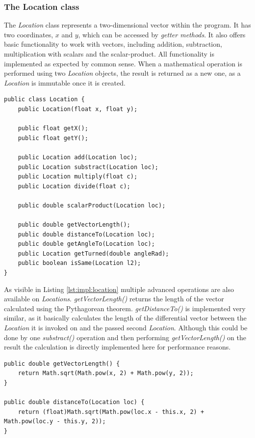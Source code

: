 \subsubsection{The Location class}

The \textit{Location} class represents a two-dimensional vector within the program. It has two coordinates, $x$ and $y$, which can be accessed by \textit{getter methods}. It also offers basic functionality to work with vectors, including addition, subtraction, multiplication with scalars and the scalar-product. All functionality is implemented as expected by common sense. When a mathematical operation is performed using two \textit{Location} objects, the result is returned as a new one, as a \textit{Location} is immutable once it is created.

\begin{lstlisting}[caption={The public interface of the Location class}, label=lst:impl:location]
public class Location {
	public Location(float x, float y);
	
	public float getX();
	public float getY();
	
	public Location add(Location loc);
	public Location substract(Location loc);
	public Location multiply(float c);
	public Location divide(float c);
	
	public double scalarProduct(Location loc);
	
	public double getVectorLength();
	public double distanceTo(Location loc);
	public double getAngleTo(Location loc);
	public Location getTurned(double angleRad);
	public boolean isSame(Location l2);
}
\end{lstlisting}

As visible in Listing \ref{lst:impl:location} multiple advanced operations are also available on \textit{Locations}. \textit{getVectorLength()} returns the length of the vector calculated using the Pythagorean theorem. \textit{getDistanceTo()} is implemented very similar, as it basically calculates the length of the differential vector between the \textit{Location} it is invoked on and the passed second \textit{Location}. Although this could be done by one \textit{substract()} operation and then performing \textit{getVectorLength()} on the result the calculation is directly implemented here for performance reasons.

\begin{lstlisting}[caption={Implementation of getVectorLength() and getDistanceTo()},label=lst:impl:location_length]
public double getVectorLength() {
	return Math.sqrt(Math.pow(x, 2) + Math.pow(y, 2));
}

public double distanceTo(Location loc) {
	return (float)Math.sqrt(Math.pow(loc.x - this.x, 2) + Math.pow(loc.y - this.y, 2));
}
\end{lstlisting}

